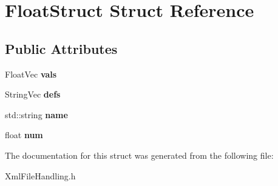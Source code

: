 \hypertarget{structFloatStruct}{
\section{FloatStruct Struct Reference}
\label{structFloatStruct}
}
\subsection*{Public Attributes}
\begin{DoxyCompactItemize}
\item 
\hypertarget{structFloatStruct_a24fabee035e4cfe9d78dfed264f14b39}{
FloatVec {\bfseries vals}}
\label{structFloatStruct_a24fabee035e4cfe9d78dfed264f14b39}

\item 
\hypertarget{structFloatStruct_a3a009ffe62634e719eeb83dc4498e26a}{
StringVec {\bfseries defs}}
\label{structFloatStruct_a3a009ffe62634e719eeb83dc4498e26a}

\item 
\hypertarget{structFloatStruct_ab7323aa80e1520280cb6f6364afcfe56}{
std::string {\bfseries name}}
\label{structFloatStruct_ab7323aa80e1520280cb6f6364afcfe56}

\item 
\hypertarget{structFloatStruct_a5e2336494423758de5844f9369cafd56}{
float {\bfseries num}}
\label{structFloatStruct_a5e2336494423758de5844f9369cafd56}

\end{DoxyCompactItemize}


The documentation for this struct was generated from the following file:\begin{DoxyCompactItemize}
\item 
XmlFileHandling.h\end{DoxyCompactItemize}
